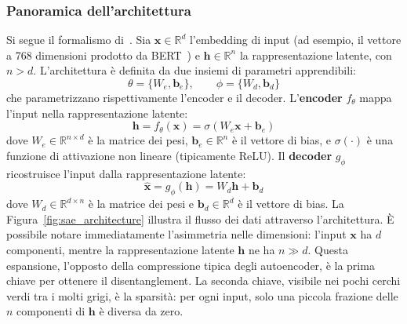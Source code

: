 \subsubsection{Panoramica dell'architettura}
\label{subsubsec:sae_overview}
Si segue il formalismo di~\parencite{oneill2024disentangling}. Sia $\mathbf{x} \in \mathbb{R}^d$ l'embedding di input (ad esempio, il vettore a 768 dimensioni prodotto da BERT~\parencite{devlin2018bert}) e $\mathbf{h} \in \mathbb{R}^n$ la rappresentazione latente, con $n > d$. L'architettura è definita da due insiemi di parametri apprendibili:
\begin{equation}
    \theta = \{W_e, \mathbf{b}_e\}, \qquad \phi = \{W_d, \mathbf{b}_d\}
\end{equation}
che parametrizzano rispettivamente l'encoder e il decoder.
L'\textbf{encoder} $f_\theta$ mappa l'input nella rappresentazione latente:
\begin{equation}
    \mathbf{h} = f_\theta(\mathbf{x}) = \sigma(W_e \mathbf{x} + \mathbf{b}_e)
    \label{eq:sae_encoder}
\end{equation}
dove $W_e \in \mathbb{R}^{n \times d}$ è la matrice dei pesi, $\mathbf{b}_e \in \mathbb{R}^n$ è il vettore di bias, e $\sigma(\cdot)$ è una funzione di attivazione non lineare (tipicamente ReLU).
Il \textbf{decoder} $g_\phi$ ricostruisce l'input dalla rappresentazione latente:
\begin{equation}
    \hat{\mathbf{x}} = g_\phi(\mathbf{h}) = W_d \mathbf{h} + \mathbf{b}_d
    \label{eq:sae_decoder}
\end{equation}
dove $W_d \in \mathbb{R}^{d \times n}$ è la matrice dei pesi e $\mathbf{b}_d \in \mathbb{R}^d$ è il vettore di bias.
La Figura~\ref{fig:sae_architecture} illustra il flusso dei dati attraverso l'architettura. È possibile notare immediatamente l'asimmetria nelle dimensioni: l'input $\mathbf{x}$ ha $d$ componenti, mentre la rappresentazione latente $\mathbf{h}$ ne ha $n \gg d$. Questa espansione, l'opposto della compressione tipica degli autoencoder, è la prima chiave per ottenere il disentanglement. La seconda chiave, visibile nei pochi cerchi verdi tra i molti grigi, è la sparsità: per ogni input, solo una piccola frazione delle $n$ componenti di $\mathbf{h}$ è diversa da zero.
